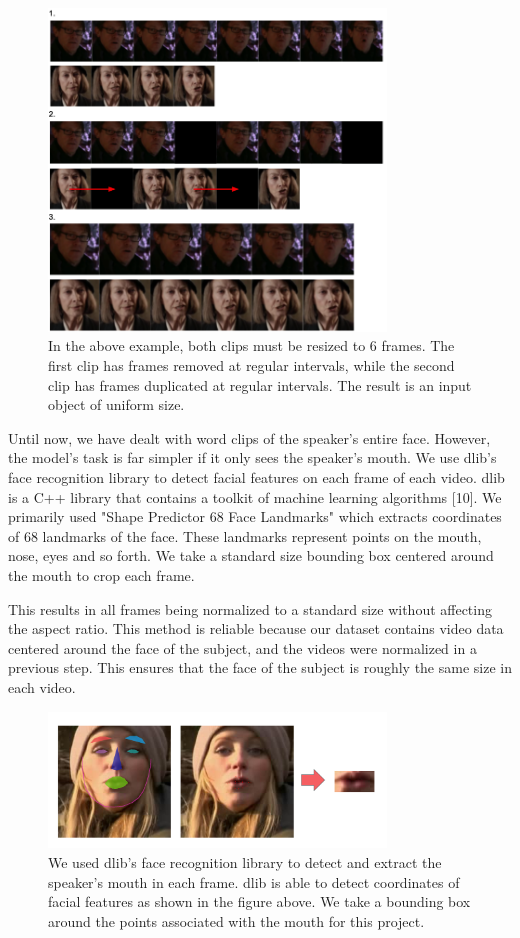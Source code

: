 \documentclass{article}
\begin{document}
   \begin{figure}[h!]
 \centering
  \includegraphics[width=0.8\textwidth]{sampling}
 \caption{In the above example, both clips must be resized to 6 frames. The first clip has frames removed at regular intervals, while the second clip has frames duplicated at regular intervals. The result is an input object of uniform size.}
 \end{figure}

Until now, we have dealt with word clips of the speaker's entire face. However, the model's task is far simpler if it only sees the speaker's mouth. We use dlib's face recognition library to detect facial features on each frame of each video. dlib is a C++ library that contains a toolkit of machine learning algorithms [10]. We primarily used "Shape Predictor 68 Face Landmarks" which extracts coordinates of 68 landmarks of the face. These landmarks represent points on the mouth, nose, eyes and so forth. We take a standard size bounding box centered around the mouth to crop each frame. 

This results in all frames being normalized to a standard size without affecting the aspect ratio. This method is reliable because our dataset contains video data centered around the face of the subject, and the videos were normalized in a previous step. This ensures that the face of the subject is roughly the same size in each video.

   \begin{figure}[h!]
 \centering
  \includegraphics[width=0.8\textwidth]{dlib}
 \caption{We used dlib's face recognition library to detect and extract the speaker's mouth in each frame. dlib is able to detect coordinates of facial features as shown in the figure above. We take a bounding box around the points associated with the mouth for this project.}
 \end{figure}
\end{document}
